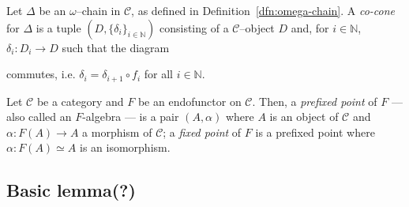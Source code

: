 \begin{dfn}\label{dfn:co-cone}
  Let \(\Delta\) be an \(\omega\)--chain in \(\mathcal{C}\), as defined in Definition~\ref{dfn:omega-chain}.
  A \emph{co-cone} for \(\Delta\) is a tuple \((D,\lbrace \delta_i \rbrace_{i \in \mathbb{N}})\) consisting of a \(\mathcal{C}\)--object \(D\) and, for \(i \in \mathbb{N}\), \(\delta_i \colon D_i \to D\) such that the diagram
  \begin{center}
  \end{center}
  commutes, i.e. \(\delta_i = \delta_{i+1} \circ f_i\) for all \(i \in \mathbb{N}\).
\end{dfn}

\begin{dfn}
  Let \(\mathcal{C}\) be a category and \(F\) be an endofunctor on \(\mathcal{C}\).
  Then, a \emph{prefixed point} of \(F\) --- also called an \(F\)-algebra --- is a pair \((A,\alpha)\) where \(A\) is an object of \(\mathcal{C}\) and \(\alpha \colon F(A) \to A\) a morphism of \(\mathcal{C}\); a \emph{fixed point} of \(F\) is a prefixed point where \(\alpha \colon F(A) \simeq A\) is an isomorphism.
\end{dfn}

\subsection{Basic lemma(?)}

